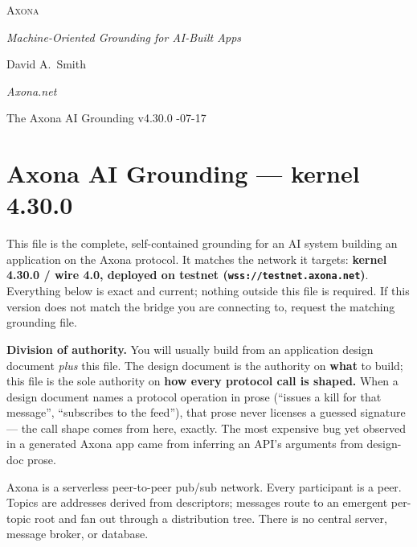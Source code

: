 \documentclass[
  nobib]{tufte-handout}
\author{}
\date{}
\begin{document}
\thispagestyle{empty}
\null\vfill
\begin{center}
{\fontsize{48}{52}\selectfont \textsc{Axona}\par}
\vspace{0.6em}
{\Large\itshape Machine-Oriented Grounding for AI-Built Apps\par}
\vspace{4em}
{\large David A.~Smith\par}
{\itshape\small Axona.net\par}
\vspace{2em}
{\small The Axona AI Grounding \quad v4.30.0 -07-17\par}
\end{center}
\vfill
\null
\newpage
\pagestyle{ndhtplain}
\thispagestyle{ndhtplain}
\setcounter{page}{1}

\section{Axona AI Grounding --- kernel
4.30.0}\label{axona-ai-grounding-kernel-4.30.0}

This file is the complete, self-contained grounding for an AI system
building an application on the Axona protocol. It matches the network it
targets: \textbf{kernel 4.30.0 / wire 4.0, deployed on testnet
(\texttt{wss://testnet.axona.net})}. Everything below is exact and
current; nothing outside this file is required. If this version does not
match the bridge you are connecting to, request the matching grounding
file.

\textbf{Division of authority.} You will usually build from an
application design document \emph{plus} this file. The design document
is the authority on \textbf{what} to build; this file is the sole
authority on \textbf{how every protocol call is shaped.} When a design
document names a protocol operation in prose (``issues a kill for that
message'', ``subscribes to the feed''), that prose never licenses a
guessed signature --- the call shape comes from here, exactly. The most
expensive bug yet observed in a generated Axona app came from inferring
an API's arguments from design-doc prose.

Axona is a serverless peer-to-peer pub/sub network. Every participant is
a peer. Topics are addresses derived from descriptors; messages route to
an emergent per-topic root and fan out through a distribution tree.
There is no central server, message broker, or database.
\end{document}
